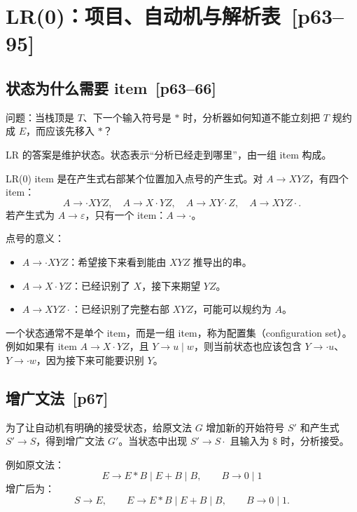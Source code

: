 \documentclass[UTF8,fontset=none,11pt]{ctexart}
\newenvironment{defbox}[1][]{%
  \par\medskip\noindent{\color{defrule}\rule{\linewidth}{1.1pt}}\par\nopagebreak
  \noindent{\bfseries\color{defrule}#1}\par\nopagebreak\smallskip}%
  {\par\nopagebreak\smallskip\noindent{\color{defrule}\rule{\linewidth}{0.4pt}}\par\medskip}
\newcommand{\pg}[1]{\texorpdfstring{{\small\color{graytext}\,[p#1]}}{ [p#1]}}
\newcommand{\eps}{\varepsilon}
\begin{document}
\section{LR(0)：项目、自动机与解析表 \pg{63--95}}

\subsection{状态为什么需要 item \pg{63--66}}

问题：当栈顶是 \(T\)、下一个输入符号是 \(*\) 时，分析器如何知道不能立刻把 \(T\) 规约成 \(E\)，而应该先移入 \(*\)？

LR 的答案是维护状态。状态表示“分析已经走到哪里”，由一组 item 构成。

\begin{defbox}[LR(0) item]
LR(0) item 是在产生式右部某个位置加入点号的产生式。对 \(A\to XYZ\)，有四个 item：
\[
A\to \cdot XYZ,\quad A\to X\cdot YZ,\quad A\to XY\cdot Z,\quad A\to XYZ\cdot.
\]
若产生式为 \(A\to\eps\)，只有一个 item：\(A\to\cdot\)。
\end{defbox}

点号的意义：

\begin{itemize}
  \item \(A\to\cdot XYZ\)：希望接下来看到能由 \(XYZ\) 推导出的串。
  \item \(A\to X\cdot YZ\)：已经识别了 \(X\)，接下来期望 \(YZ\)。
  \item \(A\to XYZ\cdot\)：已经识别了完整右部 \(XYZ\)，可能可以规约为 \(A\)。
\end{itemize}

一个状态通常不是单个 item，而是一组 item，称为配置集（configuration set）。例如如果有 item \(A\to X\cdot YZ\)，且 \(Y\to u\mid w\)，则当前状态也应该包含 \(Y\to\cdot u\)、\(Y\to\cdot w\)，因为接下来可能要识别 \(Y\)。

\subsection{增广文法 \pg{67}}

\begin{defbox}[增广文法]
为了让自动机有明确的接受状态，给原文法 \(G\) 增加新的开始符号 \(S'\) 和产生式 \(S'\to S\)，得到增广文法 \(G'\)。当状态中出现 \(S'\to S\cdot\) 且输入为 \(\$\) 时，分析接受。
\end{defbox}

例如原文法：
\[
E\to E*B\mid E+B\mid B,\qquad B\to 0\mid 1
\]
增广后为：
\[
S\to E,\qquad E\to E*B\mid E+B\mid B,\qquad B\to 0\mid 1.
\]
\end{document}
